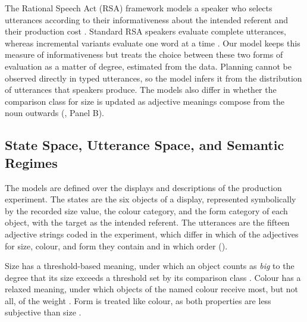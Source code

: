 \documentclass[10pt,a4paper,fleqn]{article}
\begin{document}
The Rational Speech Act (RSA) framework models a speaker who selects utterances according to their informativeness about the intended referent and their production cost \citep{frank2012predicting,goodman2016pragmatic}.
Standard RSA speakers evaluate complete utterances, whereas incremental variants evaluate one word at a time \citep{cohngordon2019incremental,schlotterbeck2023incremental}.
Our model keeps this measure of informativeness but treats the choice between these two forms of evaluation as a matter of degree, estimated from the data.
Planning cannot be observed directly in typed utterances, so the model infers it from the distribution of utterances that speakers produce.
The models also differ in whether the comparison class for size is updated as adjective meanings compose from the noun outwards (, Panel B).


\subsection{State Space, Utterance Space, and Semantic Regimes}
\label{sec:model:response-space}
\label{sec:model:semantic-comparison}

The models are defined over the displays and descriptions of the production experiment.
The states are the six objects of a display, represented symbolically by the recorded size value, the colour category, and the form category of each object, with the target as the intended referent.
The utterances are the fifteen adjective strings coded in the experiment, which differ in which of the adjectives for size, colour, and form they contain and in which order ().

Size has a threshold-based meaning, under which an object counts as \emph{big} to the degree that its size exceeds a threshold set by its comparison class \citep{schmidt2009how,franke2019subjectivity}.
Colour has a relaxed meaning, under which objects of the named colour receive most, but not all, of the weight \citep{degen2020redundancy}.
Form is treated like colour, as both properties are less subjective than size \citep[p.~56]{scontras2017subjectivity}.
\end{document}
